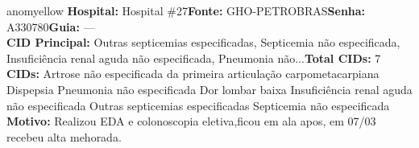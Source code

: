 \documentclass[a4paper,10pt]{article}
\begin{document}
\begin{anomalycard}[Interna\c{c}\~{a}o \#167918 | Pac. \#99756 | MODERADO (z=2.69) | LOS: 3d | 06/03/2026\,$\to$\,09/03/2026]{anomyellow}
\textbf{Hospital:} Hospital \#27\quad \textbf{Fonte:} GHO-PETROBRAS\quad \textbf{Senha:} A330780\quad \textbf{Guia:} ---\\

\textbf{CID Principal:} {\small Outras septicemias especificadas, Septicemia não especificada, Insuficiência renal aguda não especificada, Pneumonia não...}\quad\textbf{Total CIDs:} 7\\

\textbf{CIDs:} {\scriptsize Artrose não especificada da primeira articulação carpometacarpiana \textbar{} Dispepsia \textbar{} Pneumonia não especificada \textbar{} Dor lombar baixa \textbar{} Insuficiência renal aguda não especificada \textbar{} Outras septicemias especificadas \textbar{} Septicemia não especificada}\\

\textbf{Motivo:} {\scriptsize Realizou EDA e  colonoscopia eletiva,ficou em ala apos, em 07/03 recebeu alta mehorada.}\\




\end{anomalycard}
\end{document}
